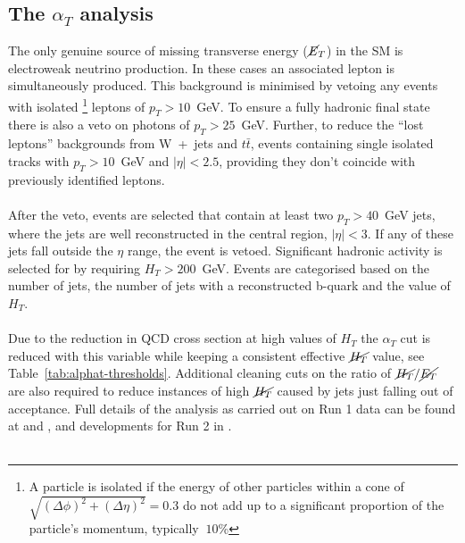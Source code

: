 \subsection{The \boldmath $\alpha_T$ analysis}

The only genuine source of missing transverse energy ($\cancel{E}_T$) in the SM is electroweak neutrino production. In these cases an associated lepton is simultaneously produced. This background is minimised by vetoing any events with isolated \footnote{A particle is isolated if the energy of other particles within a cone of $\sqrt{(\Delta\phi)^2+(\Delta\eta)^2}=0.3$ do not add up to a significant proportion of the particle's momentum, typically $~10$\%} leptons of $p_T>10$~GeV. To ensure a fully hadronic final state there is also a veto on photons of $p_T>25$~GeV. Further, to reduce the ``lost leptons'' backgrounds from W~+~jets 
and $t\bar{t}$, events containing single isolated tracks with $p_T >10$~GeV and $|\eta| < 2.5$, providing they don't coincide with previously identified leptons.
\\\\
After the veto, events are selected that contain at least two $p_T>40$~GeV jets, where the jets are well reconstructed in the central region, $|\eta|<3$. If any of these jets fall outside the $\eta$ range, the event is vetoed. Significant hadronic activity is selected for by requiring $H_T>200$~GeV. Events are categorised based on the number of jets, the number of jets with a reconstructed b-quark and the value of $H_T$. 
\\\\
Due to the reduction in QCD cross section at high values of $H_T$ the $\alpha_T$ cut is reduced with this variable while keeping a consistent effective $\cancel{H_T}$ value, see Table~\ref{tab:alphat-thresholds}. Additional cleaning cuts on the ratio of $\cancel{H_T}/\cancel{E_T}$ are also required to reduce instances of high $\cancel{H_T}$ caused by jets just falling out of acceptance. Full details of the analysis as carried out on Run 1 data can be found at \cite{AlphaT8TeVChatrchyan:2013lya} and \cite{AlphaT_7TeV_PRLChatrchyan:2011zy}, and developments for Run 2 in \cite{AN-15-004}.
\\\\

